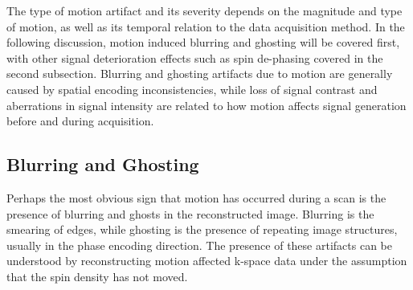 \documentclass[class=article, crop=false]{standalone}
\begin{document}
The type of motion artifact and its severity depends on the magnitude and type of motion, as well as its temporal relation to the data acquisition method. In the following discussion, motion induced blurring and ghosting will be covered first, with other signal deterioration effects such as spin de-phasing covered in the second subsection. Blurring and ghosting artifacts due to motion are generally caused by spatial encoding inconsistencies, while loss of signal contrast and aberrations in signal intensity are related to how motion affects signal generation before and during acquisition.

\subsection{Blurring and Ghosting}

Perhaps the most obvious sign that motion has occurred during a scan is the presence of blurring and ghosts in the reconstructed image. Blurring is the smearing of edges, while ghosting is the presence of repeating image structures, usually in the phase encoding direction. The presence of these artifacts can be understood by reconstructing motion affected k-space data under the assumption that the spin density has not moved.
\end{document}

